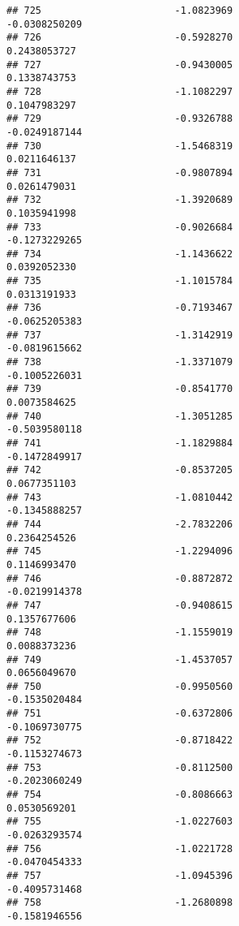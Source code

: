 \documentclass[
]{article}
\begin{document}
\begin{verbatim}
## 725                       -1.0823969                         -0.0308250209
## 726                       -0.5928270                          0.2438053727
## 727                       -0.9430005                          0.1338743753
## 728                       -1.1082297                          0.1047983297
## 729                       -0.9326788                         -0.0249187144
## 730                       -1.5468319                          0.0211646137
## 731                       -0.9807894                          0.0261479031
## 732                       -1.3920689                          0.1035941998
## 733                       -0.9026684                         -0.1273229265
## 734                       -1.1436622                          0.0392052330
## 735                       -1.1015784                          0.0313191933
## 736                       -0.7193467                         -0.0625205383
## 737                       -1.3142919                         -0.0819615662
## 738                       -1.3371079                         -0.1005226031
## 739                       -0.8541770                          0.0073584625
## 740                       -1.3051285                         -0.5039580118
## 741                       -1.1829884                         -0.1472849917
## 742                       -0.8537205                          0.0677351103
## 743                       -1.0810442                         -0.1345888257
## 744                       -2.7832206                          0.2364254526
## 745                       -1.2294096                          0.1146993470
## 746                       -0.8872872                         -0.0219914378
## 747                       -0.9408615                          0.1357677606
## 748                       -1.1559019                          0.0088373236
## 749                       -1.4537057                          0.0656049670
## 750                       -0.9950560                         -0.1535020484
## 751                       -0.6372806                         -0.1069730775
## 752                       -0.8718422                         -0.1153274673
## 753                       -0.8112500                         -0.2023060249
## 754                       -0.8086663                          0.0530569201
## 755                       -1.0227603                         -0.0263293574
## 756                       -1.0221728                         -0.0470454333
## 757                       -1.0945396                         -0.4095731468
## 758                       -1.2680898                         -0.1581946556

\end{verbatim}
\end{document}
